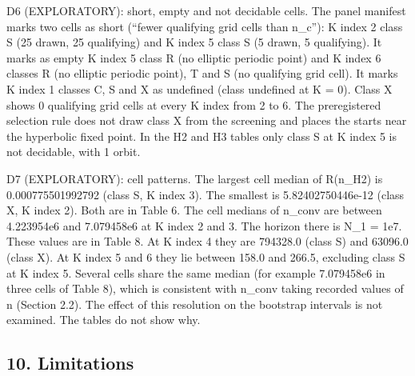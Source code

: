 \documentclass[
  11pt,
]{article}
\begin{document}
D6 (EXPLORATORY): short, empty and not decidable cells. The panel
manifest marks two cells as short (``fewer qualifying grid cells than
n\_c''): K index 2 class S (25 drawn, 25 qualifying) and K index 5 class
S (5 drawn, 5 qualifying). It marks as empty K index 5 class R (no
elliptic periodic point) and K index 6 classes R (no elliptic periodic
point), T and S (no qualifying grid cell). It marks K index 1 classes C,
S and X as undefined (class undefined at K = 0). Class X shows 0
qualifying grid cells at every K index from 2 to 6. The preregistered
selection rule does not draw class X from the screening and places the
starts near the hyperbolic fixed point. In the H2 and H3 tables only
class S at K index 5 is not decidable, with 1 orbit.

D7 (EXPLORATORY): cell patterns. The largest cell median of R(n\_H2) is
0.000775501992792 (class S, K index 3). The smallest is
5.82402750446e-12 (class X, K index 2). Both are in Table 6. The cell
medians of n\_conv are between 4.223954e6 and 7.079458e6 at K index 2
and 3. The horizon there is N\_1 = 1e7. These values are in Table 8. At
K index 4 they are 794328.0 (class S) and 63096.0 (class X). At K index
5 and 6 they lie between 158.0 and 266.5, excluding class S at K index
5. Several cells share the same median (for example 7.079458e6 in three
cells of Table 8), which is consistent with n\_conv taking recorded
values of n (Section 2.2). The effect of this resolution on the
bootstrap intervals is not examined. The tables do not show why.

\subsection{10. Limitations}\label{limitations}
\end{document}
